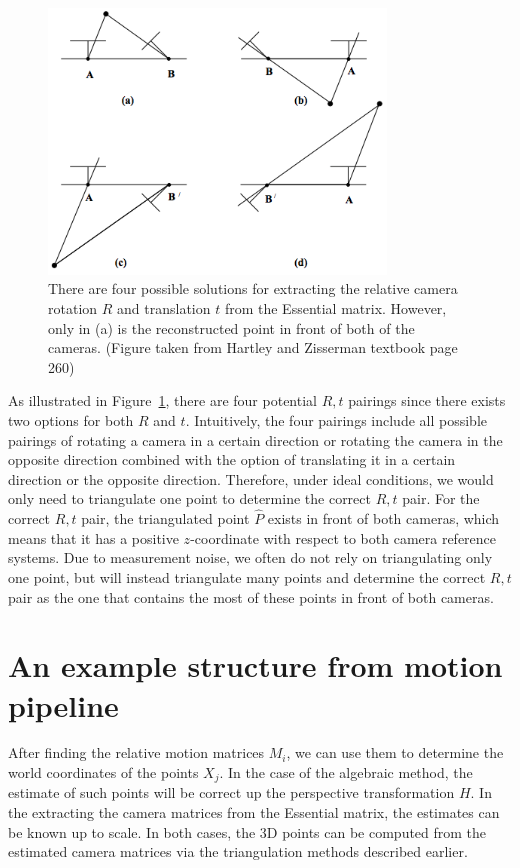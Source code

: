 \documentclass[a4paper, 12pt]{article}
\numberwithin{equation}{section}
\begin{document}
\begin{figure}[h!]
\centering
\includegraphics[width=0.8\textwidth]{figures/four_rt.png}
\caption{There are four possible solutions for extracting the relative camera rotation $R$ and translation $t$ from the Essential matrix. However, only in (a) is the reconstructed point in front of both of the cameras. (Figure taken from Hartley and Zisserman textbook page 260)}
\label{fig:four_rt}
\end{figure}

As illustrated in Figure~\ref{fig:four_rt}, there are four potential $R,t$ pairings since there exists two options for both $R$ and $t$. Intuitively, the four pairings include all possible pairings of rotating a camera in a certain direction or rotating the camera in the opposite direction combined with the option of translating it in a certain direction or the opposite direction. Therefore, under ideal conditions, we would only need to triangulate one point to determine the correct $R,t$ pair. For the correct $R,t$ pair, the triangulated point $\hat{P}$ exists in front of both cameras, which means that it has a positive $z$-coordinate with respect to both camera reference systems. Due to measurement noise, we often do not rely on triangulating only one point, but will instead triangulate many points and determine the correct $R,t$ pair as the one that contains the most of these points in front of both cameras.

\section{An example structure from motion pipeline}
After finding the relative motion matrices $M_i$, we can use them to determine the world coordinates of the points $X_j$. In the case of the algebraic method, the estimate of such points will be correct up the perspective transformation $H$. In the extracting the camera matrices from the Essential matrix, the estimates can be known up to scale. In both cases, the 3D points can be computed from the estimated camera matrices via the triangulation methods described earlier.
\end{document}
